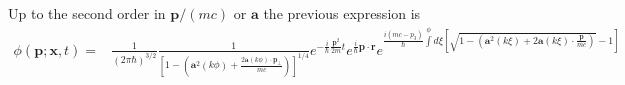 Up to the second order in ${\bm p}/(mc)$ or ${\bm a}$ the previous expression is
\begin{align}
    \phi({\bm p};{\bm x},t)= & \frac1{(2\pi\hbar)^{3/2}}\frac1{\left[1-\left({\bm a}^2(k\phi)+\frac{2{\bm a}(k\phi)\cdot{\bm p}_\perp}{mc}\right)\right]^{1/4}}e^{-\frac{i}{\hbar}\frac{{\bm p}^2}{2m}t}e^{\frac{i}{\hbar}{\bm p}\cdot{\bm r}}
    e^{\frac{i(mc-p_3)}{\hbar}\int\limits^{\phi}d\xi\left[\sqrt{1-\left({\bm a}^2(k\xi)+2{\bm a}(k\xi)\cdot\frac{\bm p}{mc}\right)}-1\right]}
\end{align}


